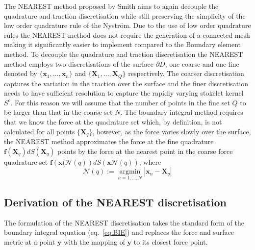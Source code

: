 The NEAREST method proposed by Smith \cite{Smith2018AEquation} aims to again decouple the quadrature and traction discretisation while still preserving the simplicity of the low order quadrature rule of the Nyström. Due to the use of low order quadrature rules the NEAREST method does not require the generation of a connected mesh making it significantly easier to implement compared to the Boundary element method. To decouple the quadrature and traction discretisation the NEAREST method employs two discretisations of the surface $\partial D$, one coarse and one fine denoted by $\{\bm{x}_1, \dots, \bm{x}_n\}$ and $\{\bm{X}_1, \dots, \bm{X}_Q\}$ respectively. The coarser discretisation captures the variation in the traction over the surface and the finer discretisation needs to have sufficient resolution to capture the rapidly varying stokelet kernel $S^\epsilon$. For this reason we will assume that the number of points in the fine set $Q$ to be larger than that in the coarse set $N$. The boundary integral method requires that we know the force at the quadrature set which, by definition, is not calculated for all points $\{\bm{X}_q\}$, however, as the force varies slowly over the surface, the NEAREST method approximates the force at the fine quadrature $\bm{f}(\bm{X}_q)dS(\bm{X}_q)$ points by the force at the nearest point in the coarse force quadrature set $\bm{f}\left(\bm{x}(\mathcal{N}(q)\right) d S(\bm{x}\mathcal{N}(q))$, where 
\begin{equation}
\label{eq:NEARESTmap}
    \mathcal{N}(q) := \underset{n=1, \ldots, N}{\operatorname{argmin}}|\boldsymbol{x}_n-\boldsymbol{X}_q|
\end{equation}

\subsection{Derivation of the NEAREST discretisation}
The formulation of the NEAREST discretisation takes the standard form of the boundary integral equation (eq.~\ref{eq:BIE}) and replaces the force and surface metric at a point $\bm{y}$ with the mapping of $\bm{y}$ to its closest force point.

